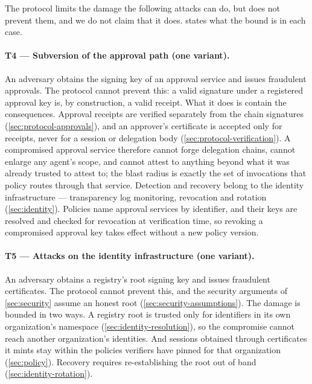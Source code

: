 \documentclass[11pt,a4paper]{article}
\begin{document}
The protocol limits the damage the following attacks can do, but does
not prevent them, and we do not claim that it does.
 states what the bound is in each case.

\paragraph{T4 --- Subversion of the approval path (one variant).}

 An adversary obtains the
signing key of an approval service and issues fraudulent approvals. The
protocol cannot prevent this: a valid signature under a registered
approval key is, by construction, a valid receipt. What it does is
contain the consequences. Approval receipts are verified separately from
the chain signatures (\cref{sec:protocol-approvals}), and an approver's
certificate is accepted only for receipts, never for a session or
delegation body (\cref{sec:protocol-verification}). A compromised
approval service therefore cannot forge delegation chains, cannot
enlarge any agent's scope, and cannot attest to anything beyond what it
was already trusted to attest to; the blast radius is exactly the set of
invocations that policy routes through that service. Detection and
recovery belong to the identity infrastructure --- transparency log
monitoring, revocation and rotation (\cref{sec:identity}). Policies name
approval services by identifier, and their keys are resolved and checked
for revocation at verification time, so revoking a compromised approval
key takes effect without a new policy version.

\paragraph{T5 --- Attacks on the identity infrastructure (one variant).}

 An adversary obtains a
registry's root signing key and issues fraudulent certificates. The
protocol cannot prevent this, and the security arguments of
\cref{sec:security} assume an honest root
(\cref{sec:security-assumptions}). The damage is bounded in two ways. A
registry root is trusted only for identifiers in its own organization's
namespace (\cref{sec:identity-resolution}), so the compromise cannot
reach another organization's identities. And sessions obtained through
certificates it mints stay within the policies verifiers have pinned for
that organization (\cref{sec:policy}). Recovery requires re-establishing
the root out of band (\cref{sec:identity-rotation}).
\end{document}
